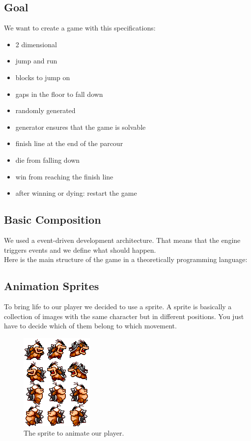 \subsection{Goal}
  We want to create a game with this specifications:
  \begin{itemize}
    \item 2 dimensional
    \item jump and run
    \item blocks to jump on
    \item gaps in the floor to fall down
    \item randomly generated
    \item generator ensures that the game is solvable
    \item finish line at the end of the parcour
    \item die from falling down
    \item win from reaching the finish line
    \item after winning or dying: restart the game
  \end{itemize}

\subsection{Basic Composition}
We used a event-driven development architecture. That means that the engine triggers events and we define what should happen.\bigskip\\
Here is the main structure of the game in a theoretically programming language:


\subsection{Animation Sprites}
To bring life to our player we decided to use a sprite. A sprite is basically a collection of images with the same character but in different positions. You just have to decide which of them belong to which movement.\bigskip\\

\begin{figure}[H]
  \includegraphics{images/player.png}
  \caption{The sprite to animate our player.}
\end{figure}


